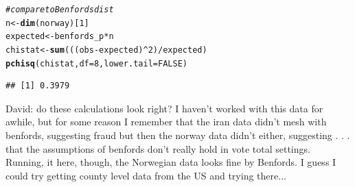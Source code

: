 \documentclass{article}\usepackage[]{graphicx}\usepackage[]{color}
\makeatletter
\newcommand{\hlnum}[1]{\textcolor[rgb]{0.686,0.059,0.569}{#1}}%
\newcommand{\hlcom}[1]{\textcolor[rgb]{0.678,0.584,0.686}{\textit{#1}}}%
\newcommand{\hlopt}[1]{\textcolor[rgb]{0,0,0}{#1}}%
\newcommand{\hlstd}[1]{\textcolor[rgb]{0.345,0.345,0.345}{#1}}%
\newcommand{\hlkwb}[1]{\textcolor[rgb]{0.69,0.353,0.396}{#1}}%
\newcommand{\hlkwc}[1]{\textcolor[rgb]{0.333,0.667,0.333}{#1}}%
\newcommand{\hlkwd}[1]{\textcolor[rgb]{0.737,0.353,0.396}{\textbf{#1}}}%
\newenvironment{kframe}{%
 \def\at@end@of@kframe{}%
 \ifinner\ifhmode%
  \def\at@end@of@kframe{\end{minipage}}%
  \begin{minipage}{\columnwidth}%
 \fi\fi%
 \def\FrameCommand##1{\hskip\@totalleftmargin \hskip-\fboxsep
 \colorbox{shadecolor}{##1}\hskip-\fboxsep
     \hskip-\linewidth \hskip-\@totalleftmargin \hskip\columnwidth}%
 \MakeFramed {\advance\hsize-\width
   \@totalleftmargin\z@ \linewidth\hsize
   \@setminipage}}%
 {\par\unskip\endMakeFramed%
 \at@end@of@kframe}
\newenvironment{knitrout}{}{} %
\makeatother
\begin{document}
\begin{knitrout}
\begin{kframe}\begin{alltt}
\hlcom{# compare to Benfords dist}
\hlstd{n} \hlkwb{<-} \hlkwd{dim}\hlstd{(norway)[}\hlnum{1}\hlstd{]}
\hlstd{expected} \hlkwb{<-} \hlstd{benfords_p} \hlopt{*} \hlstd{n}
\hlstd{chistat} \hlkwb{<-} \hlkwd{sum}\hlstd{(((obs} \hlopt{-} \hlstd{expected)}\hlopt{^}\hlnum{2}\hlstd{)}\hlopt{/}\hlstd{expected)}
\hlkwd{pchisq}\hlstd{(chistat,} \hlkwc{df} \hlstd{=} \hlnum{8}\hlstd{,} \hlkwc{lower.tail} \hlstd{=} \hlnum{FALSE}\hlstd{)}
\end{alltt}
\begin{verbatim}
## [1] 0.3979
\end{verbatim}
\end{kframe}
\end{knitrout}


David: do these calculations look right?  I haven't worked with this data for awhile, but for some reason I remember that the iran data didn't mesh with benfords, suggesting fraud but then the norway data didn't either, suggesting . . . that the assumptions of benfords don't really hold in vote total settings.  Running, it here, though, the Norwegian data looks fine by Benfords.  I guess I could try getting county level data from the US and trying there...
\end{document}
